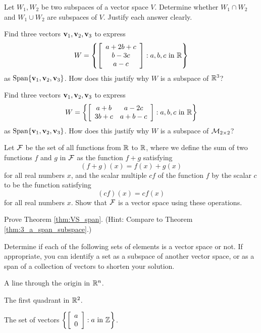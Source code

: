 	
\item Let $W_1, W_2$ be two subspaces of a vector space $V$. Determine whether $W_1 \cap W_2$ and $W_1 \cup W_2$ are subspaces of $V$. Justify each answer clearly.

\item Find three vectors $\mathbf{v}_1, \mathbf{v}_2, \mathbf{v}_3$ to express 
\[W=\left\{ \left[ \begin{array}{c} a+2b+c \\ b-3c \\ a-c \end{array} \right] : a, b, c \text{ in } \mathbb{R} \right\}\]
as $\text{Span} \{\mathbf{v}_1, \mathbf{v}_2, \mathbf{v}_3\} $. How does this justify why $W$ is a subspace of $\mathbb{R}^3$?
 
\item Find three vectors $\mathbf{v}_1, \mathbf{v}_2, \mathbf{v}_3$ to express 
\[W=\left\{ \left[ \begin{array}{cc} a+b & a-2c \\ 3b+c & a+b-c \end{array} \right] : a, b, c \text{ in } \mathbb{R} \right\}\]
as $\text{Span} \{\mathbf{v}_1, \mathbf{v}_2, \mathbf{v}_3\} $. How does this justify why $W$ is a subspace of $\mathcal{M}_{2 \times 2}$?

\item Let $\mathcal{F}$ be the set of all functions from $\mathbb{R}$ to $\mathbb{R}$, where we define the sum of two functions $f$ and $g$ in $\mathcal{F}$ as the function $f+g$ satisfying
\[(f+g)(x) = f(x) + g(x)\]
for all real numbers $x$, and the scalar multiple $cf$ of the function $f$ by the scalar $c$ to be the function satisfying
\[(cf)(x) = cf(x)\]
for all real numbers $x$. Show that $\mathcal{F}$ is a vector space using these operations. 

\item Prove Theorem \ref{thm:VS_span}. (Hint: Compare to Theorem \ref{thm:3_a_span_subspace}.) 


\item Determine if each of the following sets of elements is a vector space or not. If appropriate, you can identify a set as a subspace of another vector space, or as a span of a collection of vectors to shorten your solution.

\ba 
\item A line through the origin in $\mathbb{R}^n$.

\item The first quadrant in $\mathbb{R}^2$.

\item The set of vectors $\left\{ \left[ \begin{array}{c} a \\ 0 \end{array} \right] : a \text{ in } \mathbb{Z} \right\}$.


